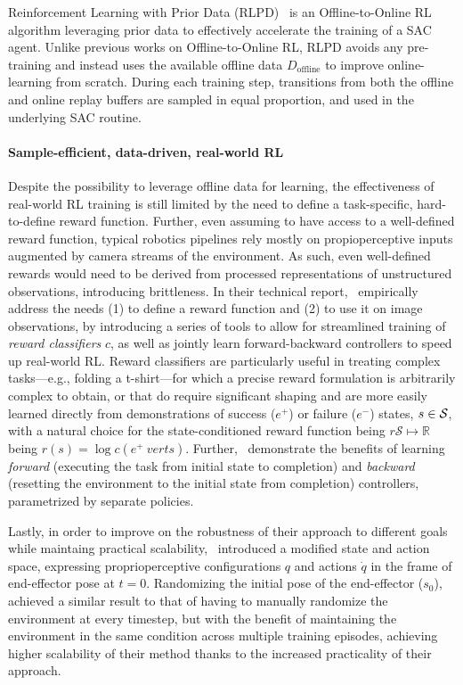Reinforcement Learning with Prior Data (RLPD)~\citep{ballEfficientOnlineReinforcement2023} is an Offline-to-Online RL algorithm leveraging prior data to effectively accelerate the training of a SAC agent.
Unlike previous works on Offline-to-Online RL, RLPD avoids any pre-training and instead uses the available offline data \( D_\text{offline} \) to improve online-learning from scratch.
During each training step, transitions from both the offline and online replay buffers are sampled in equal proportion, and used in the underlying SAC routine.

\paragraph{Sample-efficient, data-driven, real-world RL}
Despite the possibility to leverage offline data for learning, the effectiveness of real-world RL training is still limited by the need to define a task-specific, hard-to-define reward function.
Further, even assuming to have access to a well-defined reward function, typical robotics pipelines rely mostly on propioperceptive inputs augmented by camera streams of the environment.
As such, even well-defined rewards would need to be derived from processed representations of unstructured observations, introducing brittleness.
In their technical report,~\citet{luoSERLSoftwareSuite2025} empirically address the needs (1) to define a reward function and (2) to use it on image observations, by introducing a series of tools to allow for streamlined training of \emph{reward classifiers} \( c \), as well as jointly learn forward-backward controllers to speed up real-world RL.
Reward classifiers are particularly useful in treating complex tasks---e.g., folding a t-shirt---for which a precise reward formulation is arbitrarily complex to obtain, or that do require significant shaping and are more easily learned directly from demonstrations of success (\(e^+\)) or failure (\(e^-\)) states, \( s \in \mathcal S \), with a natural choice for the state-conditioned reward function being \( r \mathcal S \mapsto \mathbb R \) being \( r(s) = \log c(e^+ \ vert s ) \).
Further,~\citet{luoSERLSoftwareSuite2025} demonstrate the benefits of learning \emph{forward} (executing the task from initial state to completion) and \emph{backward} (resetting the environment to the initial state from completion) controllers, parametrized by separate policies.

Lastly, in order to improve on the robustness of their approach to different goals while maintaing practical scalability,~\citet{luoSERLSoftwareSuite2025} introduced a modified state and action space, expressing proprioperceptive configurations \( q \)  and actions \( \dot q \) in the frame of end-effector pose at \( t=0 \).
Randomizing the initial pose of the end-effector (\( s_0 \)),\citet{luoSERLSoftwareSuite2025} achieved a similar result to that of having to manually randomize the environment at every timestep, but with the benefit of maintaining the environment in the same condition across multiple training episodes, achieving higher scalability of their method thanks to the increased practicality of their approach.

